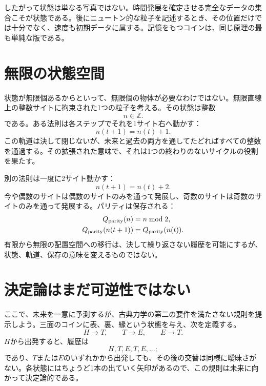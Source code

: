 したがって状態は単なる写真ではない。時間発展を確定させる完全なデータの集合こそが状態である。後にニュートン的な粒子を記述するとき、その位置だけでは十分でなく、速度も初期データに属する。記憶をもつコインは、同じ原理の最も単純な版である。

\section{無限の状態空間}

状態が無限個あるからといって、無限個の物体が必要なわけではない。無限直線上の整数サイトに拘束された1つの粒子を考える。その状態は整数
\[
  n\in\mathbb Z.
\]
である。ある法則は各ステップでそれを1サイト右へ動かす：
\begin{equation}
  n(t+1)=n(t)+1.
  \label{eq:lattice-one}
\end{equation}
この軌道は決して閉じないが、未来と過去の両方を通してたどればすべての整数を通過する。その拡張された意味で、それは1つの終わりのないサイクルの役割を果たす。

別の法則は一度に2サイト動かす：
\begin{equation}
  n(t+1)=n(t)+2.
  \label{eq:lattice-two}
\end{equation}
今や偶数のサイトは偶数のサイトのみを通って発展し、奇数のサイトは奇数のサイトのみを通って発展する。パリティは保存される：
\begin{equation}
  \begin{aligned}
    Q_{\rm parity}(n)&=n\bmod 2,\\
    Q_{\rm parity}(n(t+1))&=Q_{\rm parity}(n(t)).
  \end{aligned}
\end{equation}
有限から無限の配置空間への移行は、決して繰り返さない履歴を可能にするが、状態、軌道、保存の意味を変えるものではない。

\section{決定論はまだ可逆性ではない}

ここで、未来を一意に予測するが、古典力学の第二の要件を満たさない規則を提示しよう。三面のコインに表、裏、縁という状態を与え、次を定義する。
\begin{equation}
  H\to T,
  \qquad
  T\to E,
  \qquad
  E\to T.
  \label{eq:nonreversible-map}
\end{equation}
\(H\)から出発すると、履歴は
\[
  H,T,E,T,E,\ldots;
\]
であり、\(T\)または\(E\)のいずれかから出発しても、その後の交替は同様に曖昧さがない。各状態にはちょうど1本の出ていく矢印があるので、この規則は未来に向かって決定論的である。

